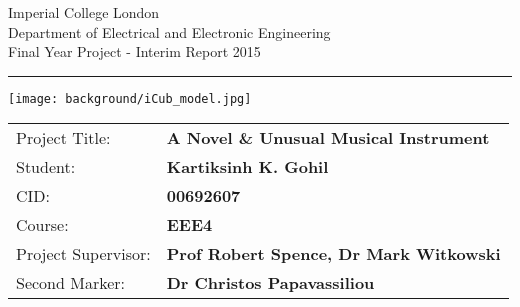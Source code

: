 \begin{titlepage}
                \setlength{\parindent}{0pt}
                \setlength{\parskip}{0pt}

                {
                                \Large
                                \raggedright
                                Imperial College London\\[17pt]
                                Department of Electrical and Electronic Engineering\\[17pt]
                                Final Year Project - Interim Report 2015\\[17pt]
 
                }

                \rule{\columnwidth}{3pt}
                \vfill
                \centering
                  \texttt{[image: background/iCub\_model.jpg]}
                \vfill
                \setlength{\tabcolsep}{0pt}

                \begin{tabular}{p{40mm}p{\dimexpr\columnwidth-40mm}}
                                Project Title: & \textbf{A Novel \& Unusual Musical Instrument} \\[12pt]
                                Student: & \textbf{Kartiksinh K. Gohil} \\[12pt]
                                CID: & \textbf{00692607} \\[12pt]
                                Course: & \textbf{EEE4} \\[12pt]
                                Project Supervisor: & \textbf{Prof Robert Spence, Dr Mark Witkowski} \\[12pt]
                                Second Marker: & \textbf{Dr Christos Papavassiliou} \\
                \end{tabular}
\end{titlepage}